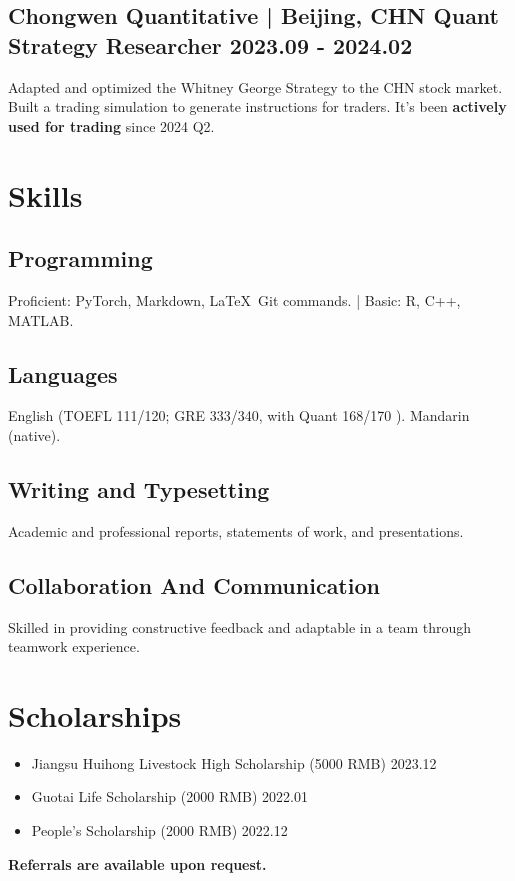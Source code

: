 \documentclass[a4paper]{article}
\begin{document}
\subsection{Chongwen Quantitative \normalfont | Beijing, CHN \hfill Quant Strategy Researcher  \hspace{40pt} 2023.09 - 2024.02}
Adapted and optimized the Whitney George Strategy to the CHN stock market. Built a trading simulation to generate instructions for traders. It's been \textbf{actively used for trading }since 2024 Q2.


\section{Skills}

\subsection{Programming}
Proficient: PyTorch, Markdown, \LaTeX\, Git commands. | Basic: R, C++, MATLAB.

\subsection{Languages}
English (TOEFL 111/120; GRE 333/340, with Quant 168/170 ). Mandarin (native). 

\subsection{Writing and Typesetting}
Academic and professional reports, statements of work, and presentations.

\subsection{Collaboration And Communication}
Skilled in providing constructive feedback and adaptable in a team through teamwork experience.

\section{Scholarships}
\begin{itemize}
    \item Jiangsu Huihong Livestock High Scholarship (5000 RMB) \hfill 2023.12
    \item Guotai Life Scholarship (2000 RMB) \hfill 2022.01
    \item People's Scholarship (2000 RMB) \hfill 2022.12
\end{itemize}

\vfill
\begin{center}
    \textbf{Referrals are available upon request.}
\end{center}
\end{document}
